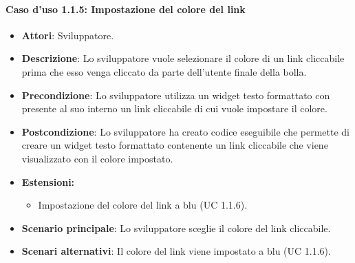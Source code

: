 \paragraph{Caso d'uso 1.1.5: Impostazione del colore del link}
\begin{itemize}
\item\textbf{Attori}: Sviluppatore.
\item\textbf{Descrizione}: Lo sviluppatore vuole selezionare il colore di un link cliccabile prima che esso venga cliccato da parte dell'utente finale della bolla.
\item\textbf{Precondizione}: Lo sviluppatore utilizza un widget testo formattato con presente al suo interno un link cliccabile di cui vuole impostare il colore.
\item\textbf{Postcondizione}: Lo sviluppatore ha creato codice eseguibile che permette di creare un widget testo formattato contenente un link cliccabile che viene visualizzato con il colore impostato.

\item\textbf{Estensioni:}
	\begin{itemize}
		\item Impostazione del colore del link a blu (UC 1.1.6).
	\end{itemize}
	
\item\textbf{Scenario principale}: Lo sviluppatore sceglie il colore del link cliccabile.
\item\textbf{Scenari alternativi}: Il colore del link viene impostato a blu (UC 1.1.6).
\end{itemize}
